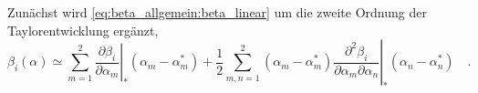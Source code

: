 	Zunächst wird \eqref{eq:beta_allgemein:beta_linear} um die zweite 
	Ordnung der Taylorentwicklung ergänzt,
     \begin{equation}
     \beta_i(\alpha) \simeq \sum\limits_{m=1}^2 \left. \frac{\partial \beta_i
     }{\partial
      \alpha_m}\right|_* \left(\alpha_m-\alpha^*_m\right) + \frac12 
      \sum\limits_{m,n=1}^2 
       \left(\alpha_m-\alpha^*_m\right)
      \left.\frac{\partial^2 \beta_i}{\partial\alpha_m \partial\alpha_n}
      \right|_* \left(\alpha_n-\alpha^*_n\right) \quad .
      \end{equation}
%     
